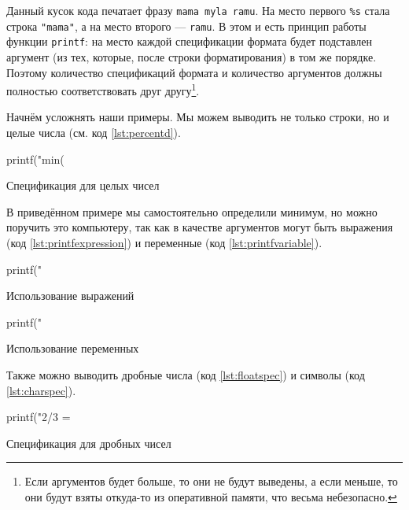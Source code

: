 \documentclass[12pt]{article}
\begin{document}
Данный кусок кода печатает фразу \verb|mama myla ramu|. На место первого \verb|%s| стала строка \verb|"mama"|, а на место второго --- \verb|ramu|. В этом и есть принцип работы функции \verb|printf|: на место каждой спецификации формата будет подставлен аргумент (из тех, которые, после строки форматирования) в том же порядке. Поэтому количество спецификаций формата и количество аргументов должны полностью соответствовать друг другу\footnote{Если аргументов будет больше, то они не будут выведены, а если меньше, то они будут взяты откуда-то из оперативной памяти, что весьма небезопасно.}.

Начнём усложнять наши примеры. Мы можем выводить не только строки, но и целые числа (см. код \ref{lst:percentd}).
\begin{listing}[H]
\begin{center}
\begin{ccode}
printf("min(%
\end{ccode}
\end{center}
\caption{Спецификация для целых чисел}
\label{lst:percentd}
\end{listing}
В приведённом примере мы самостоятельно определили минимум, но можно поручить это компьютеру, так как в качестве аргументов могут быть выражения (код \ref{lst:printfexpression}) и переменные (код \ref{lst:printfvariable}).
\begin{listing}[H]
\begin{center}
\begin{ccode}
printf("%
\end{ccode}
\end{center}
\caption{Использование выражений}
\label{lst:printfexpression}
\end{listing}
\begin{listing}[H]
\begin{center}
\begin{ccode}
printf("%
\end{ccode}
\end{center}
\caption{Использование переменных}
\label{lst:printfvariable}
\end{listing}

Также можно выводить дробные числа (код \ref{lst:floatspec}) и символы (код \ref{lst:charspec}).
\begin{listing}[H]
\begin{center}
\begin{ccode}
printf("2/3 = %
\end{ccode}
\end{center}
\caption{Спецификация для дробных чисел}
\label{lst:floatspec}
\end{listing}
\end{document}

